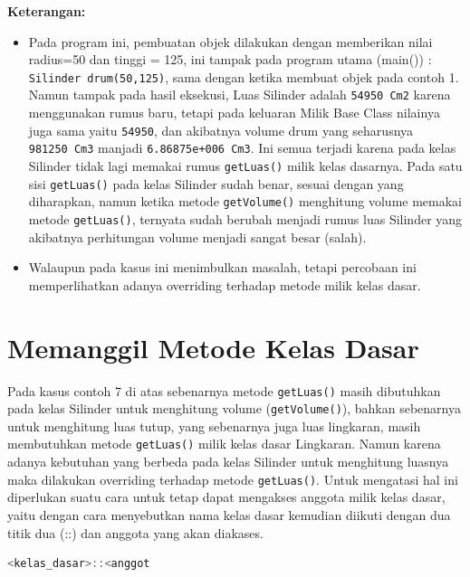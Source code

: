 \textbf{Keterangan:}

\begin{itemize}
\tightlist
\item
  Pada program ini, pembuatan objek dilakukan dengan memberikan nilai
  radius=50 dan tinggi = 125, ini tampak pada program utama (main()) :
  \texttt{Silinder\ drum(50,125)}, sama dengan ketika membuat objek pada
  contoh 1. Namun tampak pada hasil eksekusi, Luas Silinder adalah
  \texttt{54950\ Cm2} karena menggunakan rumus baru, tetapi pada
  keluaran Milik Base Class nilainya juga sama yaitu \texttt{54950}, dan
  akibatnya volume drum yang seharusnya \texttt{981250\ Cm3} manjadi
  \texttt{6.86875e+006\ Cm3}. Ini semua terjadi karena pada kelas
  Silinder tidak lagi memakai rumus \texttt{getLuas()} milik kelas
  dasarnya. Pada satu sisi \texttt{getLuas()} pada kelas Silinder sudah
  benar, sesuai dengan yang diharapkan, namun ketika metode
  \texttt{getVolume()} menghitung volume memakai metode
  \texttt{getLuas()}, ternyata sudah berubah menjadi rumus luas Silinder
  yang akibatnya perhitungan volume menjadi sangat besar (salah).
\item
  Walaupun pada kasus ini menimbulkan masalah, tetapi percobaan ini
  memperlihatkan adanya overriding terhadap metode milik kelas dasar.
\end{itemize}

\section{Memanggil Metode Kelas
Dasar}\label{memanggil-metode-kelas-dasar}

Pada kasus contoh 7 di atas sebenarnya metode \texttt{getLuas()} masih
dibutuhkan pada kelas Silinder untuk menghitung volume
(\texttt{getVolume()}), bahkan sebenarnya untuk menghitung luas tutup,
yang sebenarnya juga luas lingkaran, masih membutuhkan metode
\texttt{getLuas()} milik kelas dasar Lingkaran. Namun karena adanya
kebutuhan yang berbeda pada kelas Silinder untuk menghitung luasnya maka
dilakukan overriding terhadap metode \texttt{getLuas()}. Untuk mengatasi
hal ini diperlukan suatu cara untuk tetap dapat mengakses anggota milik
kelas dasar, yaitu dengan cara menyebutkan nama kelas dasar kemudian
diikuti dengan dua titik dua (::) dan anggota yang akan diakases.

\begin{lstlisting}[language=c++, numbers=none]
<kelas_dasar>::<anggot
\end{lstlisting}

